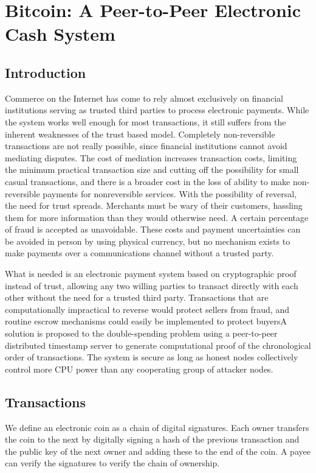\chapter{Bitcoin: A Peer-to-Peer Electronic Cash System}
\section{Introduction}

Commerce on the Internet has come to rely almost exclusively on financial institutions serving as
trusted third parties to process electronic payments. While the system works well enough for
most transactions, it still suffers from the inherent weaknesses of the trust based model.
Completely non-reversible transactions are not really possible, since financial institutions cannot
avoid mediating disputes. The cost of mediation increases transaction costs, limiting the
minimum practical transaction size and cutting off the possibility for small casual transactions,
and there is a broader cost in the loss of ability to make non-reversible payments for nonreversible
services. With the possibility of reversal, the need for trust spreads. Merchants must
be wary of their customers, hassling them for more information than they would otherwise need.
A certain percentage of fraud is accepted as unavoidable. These costs and payment uncertainties
can be avoided in person by using physical currency, but no mechanism exists to make payments
over a communications channel without a trusted party.

What is needed is an electronic payment system based on cryptographic proof instead of trust,
allowing any two willing parties to transact directly with each other without the need for a trusted
third party. Transactions that are computationally impractical to reverse would protect sellers
from fraud, and routine escrow mechanisms could easily be implemented to protect buyersA solution is proposed  to the double-spending problem using a peer-to-peer distributed
timestamp server to generate computational proof of the chronological order of transactions. The
system is secure as long as honest nodes collectively control more CPU power than any
cooperating group of attacker nodes.

\section{Transactions}

We define an electronic coin as a chain of digital signatures. Each owner transfers the coin to the
next by digitally signing a hash of the previous transaction and the public key of the next owner
and adding these to the end of the coin. A payee can verify the signatures to verify the chain of
ownership.

